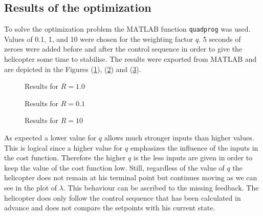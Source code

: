 \subsection{Results of the optimization}\label{sec:prob25}
To solve the optimization problem the $\mathrm{MATLAB}$ function \texttt{quadprog} was used. Values of 0.1, 1, and 10 were chosen for the weighting factor $q$. 5 seconds of zeroes were added before and after the control sequence in order to give the helicopter some time to stabilise. The results were exported from $\mathrm{MATLAB}$ and are depicted in the Figures (\ref{fig:problem2plots_q_1.0}),  (\ref{fig:problem2plots_q_0.1}) and  (\ref{fig:problem2plots_q_10}).
\begin{figure}[h]
	\centering
	\caption{Results for $R=1.0$}
	\label{fig:problem2plots_q_1.0}
\end{figure}

\begin{figure}[h]
	\centering
	\caption{Results for $R=0.1$}
	\label{fig:problem2plots_q_0.1}
\end{figure}

\begin{figure}[h]
	\centering
	\caption{Results for $R=10$}
	\label{fig:problem2plots_q_10}
\end{figure}

As expected a lower value for $q$ allows much stronger inputs than higher values. This is logical since a higher value for $q$ emphasizes the influence of the inputs in the cost function. Therefore the higher $q$ is the less inputs are given in order to keep the value of the cost function low. Still, regardless of the value of $q$ the helicopter does not remain at his terminal point but continues moving as we can see in the plot of $\lambda$. This behaviour can be ascribed to the missing feedback. The helicopter does only follow the control sequence that has been calculated in advance and does not compare the setpoints with his current state. 



